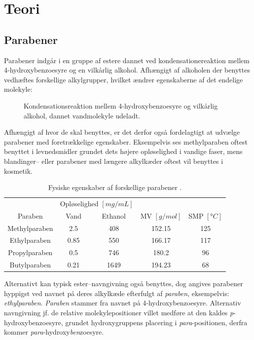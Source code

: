\section{Teori}
    \subsection{Parabener}
    Parabener indgår i en gruppe af estere dannet ved kondensationereaktion mellem 4-hydroxybenzoesyre og en vilkårlig alkohol. Afhængigt af alkoholen der benyttes vedhæftes forskellige alkylgrupper, hvilket ændrer egenskaberne af det endelige molekyle:
    \begin{figure}[H]
        \caption{Kondensationsreaktion mellem 4-hydroxybenzoesyre og vilkårlig alkohol, dannet vandmolekyle udeladt.}
    \end{figure}
    Afhængigt af hvor de skal benyttes, er det derfor også fordelagtigt at udvælge parabener med foretrækkelige egenskaber. Eksempelvis ses methylparaben oftest benyttet i levnedsmidler grundet dets højere opløselighed i vandige faser, mens blandinger-- eller parabener med længere alkylkæder oftest vil benyttes i kosmetik.
    \begin{table}[H]\centering
        \caption{Fysiske egenskaber af forskellige parabener \parencite{PubChem}.}
        \begin{tabular}{ccccc}
            \toprule
            & \multicolumn{2}{c}{Opløselighed $\left[\si{mg\per mL}\right]$} & & \\
            \cmidrule(r){2-3}
            Paraben & Vand & Ethanol & MV $\left[\si{g\per mol}\right]$ & SMP $\left[\si{\degree C}\right]$ \\
            \midrule
            Methylparaben & 2.5 & 408 & 152.15 & 125 \\
            Ethylparaben & 0.85 & 550 & 166.17 & 117 \\ 
            Propylparaben & 0.5 & 746 & 180.2 & 96 \\
            Butylparaben & 0.21 & 1649 & 194.23 & 68 \\
            \bottomrule
        \end{tabular}
    \end{table}
    Alternativt kan typisk ester--navngivning også benyttes, dog angives parabener hyppigst ved navnet på deres alkylkæde efterfulgt af \textit{paraben}, eksempelvis: \textit{ethylparaben}. \textit{Paraben} stammer fra navnet på 4-hydroxybenzoesyre. Alternativ navngivning jf. de relative molekylepositioner villet medføre at den kaldes \textit{p}-hydroxybenzoesyre, grundet hydroxygruppens placering i \textit{para}-positionen, derfra kommer \textit{para}-hydroxy\textit{ben}zoesyre.

